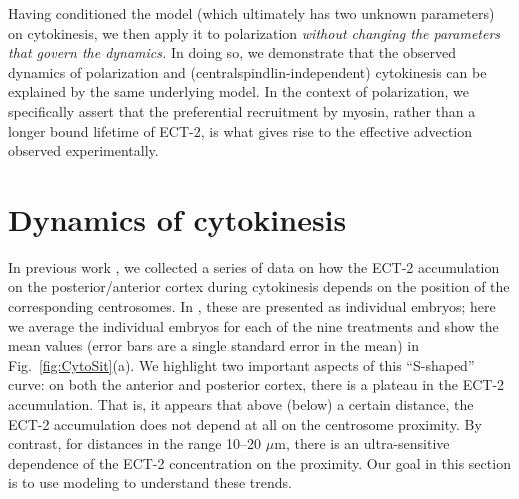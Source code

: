 \documentclass[11pt]{article}
\begin{document}
Having conditioned the model (which ultimately has two unknown parameters) on cytokinesis, we then apply it to polarization \emph{without changing the parameters that govern the dynamics.} In doing so, we demonstrate that the observed dynamics of polarization and (centralspindlin-independent) cytokinesis can be explained by the same underlying model. In the context of polarization, we specifically assert that the preferential recruitment by myosin, rather than a longer bound lifetime of ECT-2, is what gives rise to the effective advection observed experimentally. 

\section{Dynamics of cytokinesis}
In previous work \cite{longhini2022aurora}, we collected a series of data on how the ECT-2 accumulation on the posterior/anterior cortex during cytokinesis depends on the position of the corresponding centrosomes. In \cite[Fig.~7A]{longhini2022aurora}, these are presented as individual embryos; here we average the individual embryos for each of the nine treatments and show the mean values (error bars are a single standard error in the mean) in Fig.\ \ref{fig:CytoSit}(a). We highlight two important aspects of this ``S-shaped'' curve: on both the anterior and posterior cortex, there is a plateau in the ECT-2 accumulation. That is, it appears that above (below) a certain distance, the ECT-2 accumulation does not depend at all on the centrosome proximity. By contrast, for distances in the range 10--20 $\mu$m, there is an ultra-sensitive dependence of the ECT-2 concentration on the proximity. Our goal in this section is to use modeling to understand these trends.
\end{document}
